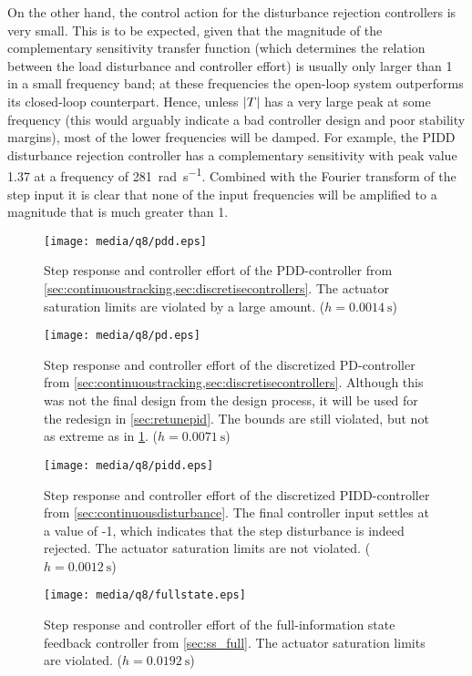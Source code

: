 On the other hand, the control action for the disturbance rejection controllers is very small. This is to be expected, given that the magnitude of the complementary sensitivity transfer function (which determines the relation between the load disturbance and controller effort) is usually only larger than 1 in a small frequency band; at these frequencies the open-loop system outperforms its closed-loop counterpart. Hence, unless $\abs{T}$ has a very large peak at some frequency (this would arguably indicate a bad controller design and poor stability margins), most of the lower frequencies will be damped. For example, the PIDD disturbance rejection controller has a complementary sensitivity with peak value 1.37 at a frequency of \SI{281}{\radian\per\second}. Combined with the Fourier transform of the step input it is clear that none of the input frequencies will be amplified to a magnitude that is much greater than 1.
\begin{figure}[ht!]
    \centering
    \texttt{[image: media/q8/pdd.eps]}
    \caption{Step response and controller effort of the PDD-controller from \cref{sec:continuoustracking,sec:discretisecontrollers}. The actuator saturation limits are violated by a large amount. ($h = \SI{0.0014}{\second}$)}
    \label{fig:q8_pdd}
\end{figure}
\begin{figure}[ht!]
    \centering
    \texttt{[image: media/q8/pd.eps]}
    \caption{Step response and controller effort of the discretized PD-controller from \cref{sec:continuoustracking,sec:discretisecontrollers}. Although this was not the final design from the design process, it will be used for the redesign in \cref{sec:retunepid}. The bounds are still violated, but not as extreme as in \cref{fig:q8_pdd}. ($h = \SI{0.0071}{\second}$)}
    \label{fig:q8_pd}
\end{figure}
\begin{figure}[ht!]
    \centering
    \texttt{[image: media/q8/pidd.eps]}
    \caption{Step response and controller effort of the discretized PIDD-controller from \cref{sec:continuousdisturbance}. The final controller input settles at a value of -1, which indicates that the step disturbance is indeed rejected. The actuator saturation limits are not violated. ($h = \SI{0.0012}{\second}$)}
    \label{fig:q8_pidd}
\end{figure}
\begin{figure}[ht!]
    \centering
    \texttt{[image: media/q8/fullstate.eps]}
    \caption{Step response and controller effort of the full-information state feedback controller from \cref{sec:ss_full}. The actuator saturation limits are violated. ($h = \SI{0.0192}{\second}$)}
    \label{fig:q8_fullstate}
\end{figure}

